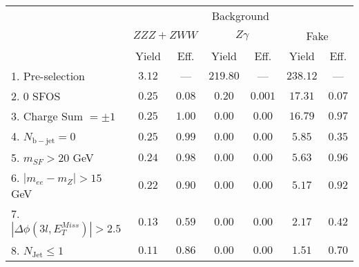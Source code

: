 \begin{tabular}{l||c|c||c|c||c|c}
\hline
 &  \multicolumn{6}{c}{Background} \\
 & \multicolumn{2}{c||}{$ZZZ+ZWW$} & \multicolumn{2}{c||}{$Z\gamma$} & \multicolumn{2}{c}{Fake}  \\ 
 & Yield & Eff. & Yield & Eff. & Yield & Eff. \\
\hline\hline
1. Pre-selection &  $3.12$ & --- &  $219.80$ &  --- &  $238.12$ &  --- \\ 
\hline
2. 0 SFOS &  $0.25$ &  $0.08$ &  $0.20$ &  $0.001$ &  $17.31$ &  $0.07$ \\ 
\hline
3. Charge Sum $= \pm 1$ &  $0.25$ &  $1.00$ &  $0.00$ &  $0.00$ &  $16.79$ &  $0.97$ \\ 
\hline
4. $N_{\mathrm{b-jet}} = 0$ &$0.25$ &  $0.99$ &  $0.00$ &  $0.00$ &  $5.85$ &  $0.35$ \\ 
\hline
5. $m_{SF} > 20$ GeV &$0.24$ &  $0.98$ &  $0.00$ &  $0.00$ &  $5.63$ &  $0.96$ \\ 
\hline
6. $|m_{ee} - m_{Z}| > 15$ GeV &$0.22$ &  $0.90$ &  $0.00$ &  $0.00$ &  $5.17$ &  $0.92$ \\ 
\hline
7. $|\Delta\phi(3l,E_{T}^{Miss})| > 2.5$ &$0.13$ &  $0.59$ &  $0.00$ &  $0.00$ &  $2.17$ &  $0.42$ \\ 
\hline
8. $N_{\mathrm{Jet}} \leq 1$ &$0.11$ &  $0.86$ &  $0.00$ &  $0.00$ &  $1.51$ &  $0.70$ \\ 
\hline
\end{tabular}



